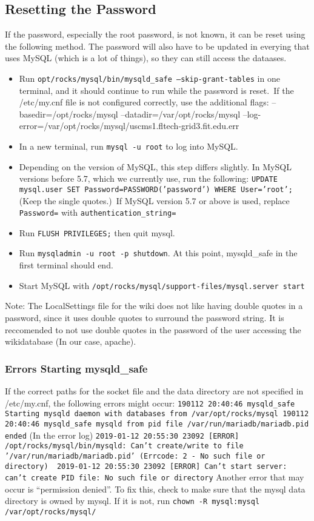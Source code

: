 \documentclass[12pt]{article}
\begin{document}
\subsection{Resetting the Password}
If the password, especially the root password, is not known, it can be reset using the following method. The password will also have to be updated in everying that uses MySQL (which is a lot of things), so they can still access the dataases.
\begin{itemize}
\item Run {\tt opt/rocks/mysql/bin/mysqld\_safe --skip-grant-tables} in one terminal, and it should continue to run while the password is reset.\
If the /etc/my.cnf file is not configured correctly, use the additional flags: --basedir=/opt/rocks/mysql --datadir=/var/opt/rocks/mysql --log-error=/var/opt/rocks/mysql/uscms1.fltech-grid3.fit.edu.err
\item In a new terminal, run {\tt mysql -u root} to log into MySQL. 
\item Depending on the version of MySQL, this step differs slightly. In MySQL versions before 5.7, which we currently use, run the following:
  {\tt UPDATE mysql.user SET Password=PASSWORD('password') WHERE User='root';}    (Keep the single quotes.)\
  If MySQL version 5.7 or above is used, replace {\tt Password=} with {\tt authentication\_string=}
\item Run {\tt FLUSH PRIVILEGES;} then quit mysql.
\item Run {\tt mysqladmin -u root -p shutdown}. At this point, mysqld\_safe in the first terminal should end.
\item Start MySQL with {\tt /opt/rocks/mysql/support-files/mysql.server start}
\end{itemize}

Note: The LocalSettings file for the wiki does not like having double quotes in a password, since it uses double quotes to surround the password string. It is reccomended to not use double quotes in the password of the user accessing the wikidatabase (In our case, apache). 

\subsubsection*{Errors Starting mysqld\_safe}
If the correct paths for the socket file and the data directory are not specified in /etc/my.cnf, the following errors might occur: 
{\tt 190112 20:40:46 mysqld\_safe Starting mysqld daemon with databases from /var/opt/rocks/mysql\
190112 20:40:46 mysqld\_safe mysqld from pid file /var/run/mariadb/mariadb.pid ended}
(In the error log)
{\tt 2019-01-12 20:55:30 23092 [ERROR] /opt/rocks/mysql/bin/mysqld: Can't create/write to file '/var/run/mariadb/mariadb.pid' (Errcode: 2 - No such file or directory) \
  2019-01-12 20:55:30 23092 [ERROR] Can't start server: can't create PID file: No such file or directory}
Another error that may occur is ``permission denied''. To fix this, check to make sure that the mysql data directory is owned by mysql. If it is not, run {\tt chown -R mysql:mysql /var/opt/rocks/mysql/ }
\end{document}
